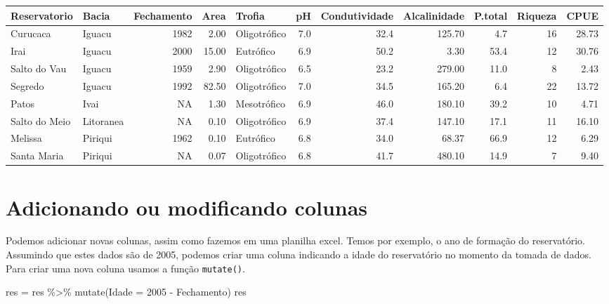 \documentclass[
]{book}
\newenvironment{Shaded}{\begin{snugshade}}{\end{snugshade}}
\newcommand{\AttributeTok}[1]{\textcolor[rgb]{0.77,0.63,0.00}{#1}}
\newcommand{\DecValTok}[1]{\textcolor[rgb]{0.00,0.00,0.81}{#1}}
\newcommand{\FunctionTok}[1]{\textcolor[rgb]{0.00,0.00,0.00}{#1}}
\newcommand{\NormalTok}[1]{#1}
\newcommand{\OtherTok}[1]{\textcolor[rgb]{0.56,0.35,0.01}{#1}}
\newcommand{\SpecialCharTok}[1]{\textcolor[rgb]{0.00,0.00,0.00}{#1}}
\begin{document}
\begin{table}
\centering\begingroup\fontsize{8}{10}\selectfont

\begin{tabular}{llrrlrrrrrr}
\toprule
Reservatorio & Bacia & Fechamento & Area & Trofia & pH & Condutividade & Alcalinidade & P.total & Riqueza & CPUE\\
\midrule
Curucaca & Iguacu & 1982 & 2.00 & Oligotrófico & 7.0 & 32.4 & 125.70 & 4.7 & 16 & 28.73\\
Irai & Iguacu & 2000 & 15.00 & Eutrófico & 6.9 & 50.2 & 3.30 & 53.4 & 12 & 30.76\\
Salto do Vau & Iguacu & 1959 & 2.90 & Oligotrófico & 6.5 & 23.2 & 279.00 & 11.0 & 8 & 2.43\\
Segredo & Iguacu & 1992 & 82.50 & Oligotrófico & 7.0 & 34.5 & 165.20 & 6.4 & 22 & 13.72\\
Patos & Ivai & NA & 1.30 & Mesotrófico & 6.9 & 46.0 & 180.10 & 39.2 & 10 & 4.71\\
\addlinespace
Salto do Meio & Litoranea & NA & 0.10 & Oligotrófico & 6.9 & 37.4 & 147.10 & 17.1 & 11 & 16.10\\
Melissa & Piriqui & 1962 & 0.10 & Eutrófico & 6.8 & 34.0 & 68.37 & 66.9 & 12 & 6.29\\
Santa Maria & Piriqui & NA & 0.07 & Oligotrófico & 6.8 & 41.7 & 480.10 & 14.9 & 7 & 9.40\\
\bottomrule
\end{tabular}
\endgroup{}
\end{table}

\hypertarget{adicionando-ou-modificando-colunas}{%
\section{Adicionando ou modificando colunas}\label{adicionando-ou-modificando-colunas}}

Podemos adicionar novas colunas, assim como fazemos em uma planilha excel. Temos por exemplo, o ano de formação do reservatório. Assumindo que estes dados são de 2005, podemos criar uma coluna indicando a idade do reservatório no momento da tomada de dados. Para criar uma nova coluna usamos a função \texttt{mutate()}.

\begin{Shaded}
\begin{Highlighting}[]
\NormalTok{res }\OtherTok{=}\NormalTok{ res }\SpecialCharTok{\%\textgreater{}\%} 
  \FunctionTok{mutate}\NormalTok{(}\AttributeTok{Idade =} \DecValTok{2005} \SpecialCharTok{{-}}\NormalTok{ Fechamento)}
\NormalTok{res}
\end{Highlighting}
\end{Shaded}
\end{document}
